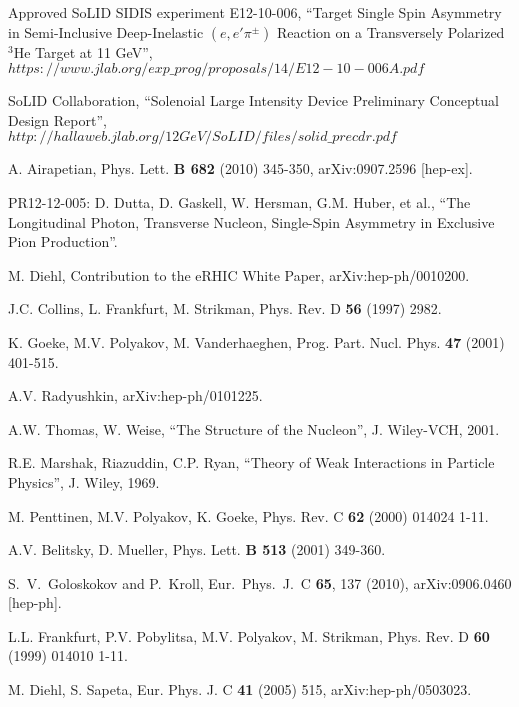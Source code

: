 \clearpage
\begin{thebibliography}{}

  Approved SoLID SIDIS experiment E12-10-006,
  ``Target Single Spin Asymmetry in Semi-Inclusive Deep-Inelastic
  $(e,e'\pi^{\pm})$ Reaction on a Transversely Polarized $\mathrm{^{3}He}$
  Target at 11 GeV'',\\
$https://www.jlab.org/exp\_prog/proposals/14/E12-10-006A.pdf$

  SoLID Collaboration, ``Solenoial Large Intensity Device Preliminary
  Conceptual Design Report'',\\
  $http://hallaweb.jlab.org/12GeV/SoLID/files/solid\_precdr.pdf$
  
 A. Airapetian, Phys. Lett. {\bf B 682} (2010) 345-350,
  arXiv:0907.2596 [hep-ex].

 PR12-12-005:
D. Dutta, D. Gaskell, W. Hersman, G.M. Huber, et al., ``The Longitudinal
Photon, Transverse Nucleon, Single-Spin Asymmetry in Exclusive Pion
Production''.

 M. Diehl, Contribution to the eRHIC White Paper,
arXiv:hep-ph/0010200.

 J.C. Collins, L. Frankfurt, M. Strikman, Phys. Rev. D {\bf 56}
  (1997) 2982.

 K. Goeke, M.V. Polyakov, M. Vanderhaeghen,
  Prog. Part. Nucl. Phys. {\bf 47} (2001) 401-515.

 A.V. Radyushkin, arXiv:hep-ph/0101225.

 A.W. Thomas, W. Weise, ``The Structure of the Nucleon'',
  J. Wiley-VCH, 2001.

 R.E. Marshak, Riazuddin, C.P. Ryan, ``Theory of Weak
  Interactions in Particle Physics'', J. Wiley, 1969.

 M. Penttinen, M.V. Polyakov, K. Goeke, Phys. Rev. C {\bf 62}
  (2000) 014024 1-11.

 A.V. Belitsky, D. Mueller, Phys. Lett. {\bf B 513}
  (2001) 349-360.

 S.~V.~Goloskokov and P.~Kroll, Eur.\ Phys.\ J.\ C {\bf 65},
  137 (2010), arXiv:0906.0460 [hep-ph].

 L.L. Frankfurt, P.V. Pobylitsa, M.V. Polyakov, M. Strikman,
  Phys. Rev. D {\bf 60} (1999) 014010 1-11.

 M. Diehl, S. Sapeta, Eur. Phys. J. C {\bf 41} (2005) 515,
  arXiv:hep-ph/0503023.


\end{thebibliography}
